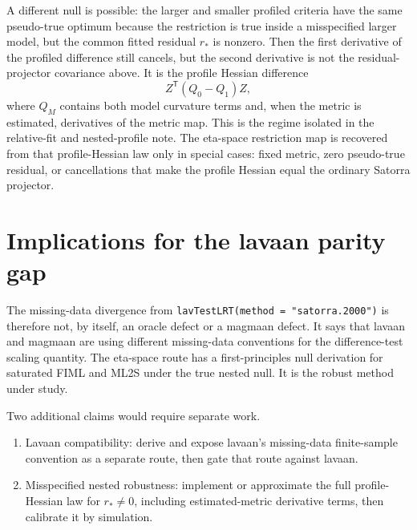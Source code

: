 \documentclass[11pt]{article}
\newcommand{\T}{^{\mathsf T}}
\theoremstyle{plain}
\theoremstyle{remark}
\begin{document}
A different null is possible: the larger and smaller profiled criteria have the
same pseudo-true optimum because the restriction is true inside a misspecified
larger model, but the common fitted residual \(r_*\) is nonzero. Then the first
derivative of the profiled difference still cancels, but the second derivative
is not the residual-projector covariance above. It is the profile Hessian
difference
\[
  Z\T(Q_0-Q_1)Z,
\]
where \(Q_M\) contains both model curvature terms and, when the metric is
estimated, derivatives of the metric map. This is the regime isolated in the
relative-fit and nested-profile note. The eta-space restriction map is recovered
from that profile-Hessian law only in special cases: fixed metric, zero
pseudo-true residual, or cancellations that make the profile Hessian equal the
ordinary Satorra projector.

\section{Implications for the lavaan parity gap}
\label{sec:parity}

The missing-data divergence from
\texttt{lavTestLRT(method = "satorra.2000")} is therefore not, by itself, an
oracle defect or a magmaan defect. It says that lavaan and magmaan are using
different missing-data conventions for the difference-test scaling quantity.
The eta-space route has a first-principles null derivation for saturated FIML
and ML2S under the true nested null. It is the robust method under study.

Two additional claims would require separate work.
\begin{enumerate}
\item Lavaan compatibility: derive and expose lavaan's missing-data finite-sample
  convention as a separate route, then gate that route against lavaan.
\item Misspecified nested robustness: implement or approximate the full
  profile-Hessian law for \(r_*\neq0\), including estimated-metric derivative
  terms, then calibrate it by simulation.
\end{enumerate}
\end{document}
